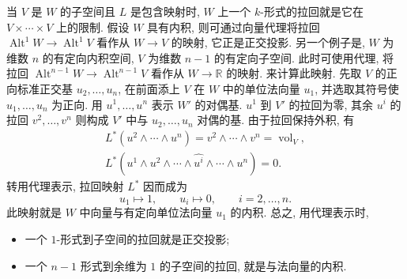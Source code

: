 {当 $V$ 是 $W$ 的子空间且 $L$ 是包含映射时, $W$ 上一个 $k$-形式的拉回就是它在 $V\times\cdots\times V$ 上的限制. 假设 $W$ 具有内积, 则可通过向量代理将拉回 $\operatorname{Alt}^1W\to\operatorname{Alt}^1V$ 看作从 $W\to V$ 的映射, 它正是正交投影. 另一个例子是, $W$ 为维数 $n$ 的有定向内积空间, $V$ 为维数 $n-1$ 的有定向子空间. 此时可使用代理, 将拉回 $\operatorname{Alt}^{n-1}W\to\operatorname{Alt}^{n-1}V$ 看作从 $W\to\mathbb R$ 的映射. 来计算此映射. 先取 $V$ 的正向标准正交基 $u_2,\ldots,u_n$, 在前面添上 $V$ 在 $W$ 中的单位法向量 $u_1$, 并选取其符号使 $u_1,\ldots,u_n$ 为正向. 用 $u^1,\ldots,u^n$ 表示 $W'$ 的对偶基. $u^1$ 到 $V'$ 的拉回为零, 其余 $u^i$ 的拉回 $v^2,\ldots,v^n$ 则构成 $V'$ 中与 $u_2,\ldots,u_n$ 对偶的基. 由于拉回保持外积, 有}
\[
\begin{gathered}
L^*(u^2\wedge\cdots\wedge u^n)=v^2\wedge\cdots\wedge v^n=\operatorname{vol}_V,\\
L^*(u^1\wedge u^2\wedge\cdots\wedge\widehat{u^i}\wedge\cdots\wedge u^n)=0.
\end{gathered}
\]
{转用代理表示, 拉回映射 $L^*$ 因而成为}
\[
u_1\mapsto1,\qquad u_i\mapsto0,\qquad i=2,\ldots,n.
\]
{此映射就是 $W$ 中向量与有定向单位法向量 $u_1$ 的内积. 总之, 用代理表示时,}

\begin{itemize}
\item{一个 $1$-形式到子空间的拉回就是正交投影;}
\item{一个 $n-1$ 形式到余维为 $1$ 的子空间的拉回, 就是与法向量的内积.}
\end{itemize}

